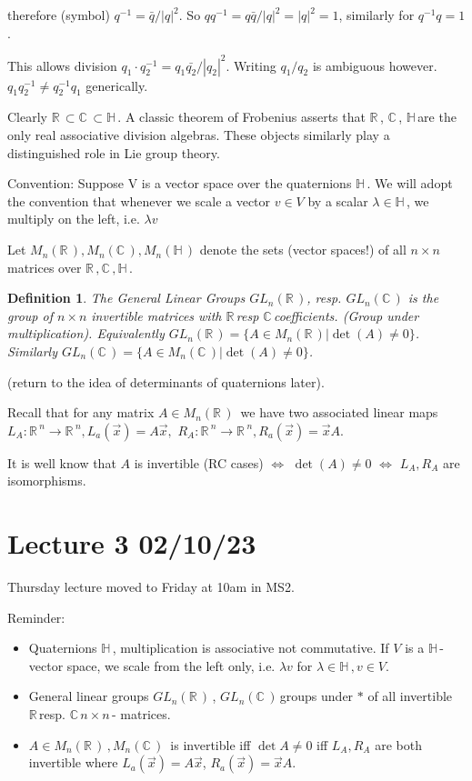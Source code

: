 \documentclass[12pt,a4paper]{article}
\newcommand{\rR}{\ensuremath{\mathbb{R}\,}}
\newcommand{\cC}{\ensuremath{\mathbb{C}\,}}
\newcommand{\hH}{\ensuremath{\mathbb{H}\,}}
\newcommand{\nn}{\ensuremath{n \times n\,}}
\newcommand{\mnr}{\ensuremath{M_n(\rR)\,}}
\newcommand{\mnc}{\ensuremath{M_n(\cC)\,}}
\newcommand{\glnr}{\ensuremath{GL_n(\rR)\,}}
\newcommand{\glnc}{\ensuremath{GL_n(\cC)\,}}
\newtheorem{defn}[thm]{Definition}
\begin{document}
therefore (symbol) $q^{-1}=\bar{q}/|q|^2$. So $qq^{-1}=q\bar{q}/|q|^2=|q|^2=1$, similarly for $q^{-1}q=1$.

This allows division $q_1\cdot q_2^{-1}=q_1 \bar{q_2}/|q_2|^2$. Writing $q_1/q_2$ is ambiguous however. $q_1 q_2^{-1}\neq q_2^{-1} q_1$ generically.

Clearly $\rR \subset \cC \subset \hH$. A classic theorem of Frobenius asserts that \rR, \cC, \hH are the only real associative division algebras. These objects similarly play a distinguished role in Lie group theory.

Convention: Suppose V is a vector space over the quaternions \hH. We will adopt the convention that whenever we scale a vector $v\in V$ by a scalar $\lambda \in \hH$, we multiply on the left, i.e. $\lambda v$

Let $M_n(\rR),  M_n(\cC),  M_n(\hH)$ denote the sets (vector spaces!) of all $n\times n$ matrices over $\rR, \cC,  \hH$.

\begin{defn} 
The General Linear Groups $GL_n(\rR)$, resp. $GL_n(\cC)$ is the group of  $n\times n$ invertible matrices with \rR resp \cC coefficients. (Group under multiplication). Equivalently $GL_n(\rR)=\{A\in M_n(\rR)| \det(A)\neq0\}$. Similarly $GL_n(\cC)=\{A\in M_n(\cC)| \det(A)\neq0\}$.
\end{defn}

(return to the idea of determinants of quaternions later).

Recall that for any matrix $A\in\mnr$ we have two associated linear maps $L_A:\rR^n\to \rR^n, L_a(\vec{x})=A\vec{x},$  $R_A:\rR^n\to \rR^n, R_a(\vec{x})=\vec{x}A.$ 

It is well know that $A$ is invertible (RC cases) $\iff$ $\det(A)\neq0$ $\iff$ $L_A, R_A$ are isomorphisms.

\section{Lecture 3 02/10/23}
Thursday lecture moved to Friday at 10am in MS2.

Reminder: 
\begin{itemize}
\item Quaternions \hH, multiplication is associative not commutative. If $V$ is a \hH - vector space, we scale from the left only, i.e. $\lambda v$ for $\lambda \in \hH, v\in V$. 
\item General linear groups \glnr, \glnc groups under $*$ of all invertible \rR resp. \cC \nn - matrices.
\item $A\in \mnr, \mnc$ is invertible iff $\det A \neq 0$ iff $L_A, R_A$ are both invertible where $L_a(\vec{x})=A\vec{x}$, $R_a(\vec{x})=\vec{x}A.$ 
\end{itemize}
\end{document}
